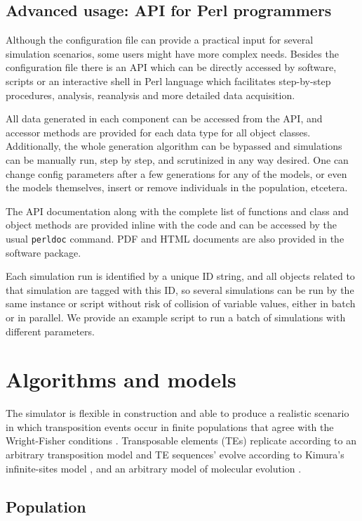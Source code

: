 \documentclass[10pt]{article}
\begin{document}
\subsection{Advanced usage: API for Perl programmers}

Although the configuration file can provide a practical input for
several simulation scenarios, some users might have more complex
needs. Besides the configuration file there is an API which can be
directly accessed by software, scripts or an interactive shell in
Perl language which facilitates step-by-step procedures, analysis,
reanalysis and more detailed data acquisition.

All data generated in each component can be accessed from the API, and
accessor methods are provided for each data type for all object
classes. Additionally, the whole generation algorithm can be bypassed
and simulations can be manually run, step by step, and scrutinized in
any way desired. One can change config parameters after a few
generations for any of the models, or even the models themselves,
insert or remove individuals in the population, etcetera.

The API documentation along with the complete list of functions and
class and object methods are provided inline with the code and can be
accessed by the usual \verb|perldoc| command. PDF and HTML documents
are also provided in the software package.

Each simulation run is identified by a unique ID string, and all
objects related to that simulation are tagged with this ID, so several
simulations can be run by the same instance or script without risk of
collision of variable values, either in batch or in parallel. We
provide an example script to run a batch of simulations with different
parameters.


\section{Algorithms and models}

The simulator is flexible in construction and able to produce a
realistic scenario in which transposition events occur in finite
populations that agree with the Wright-Fisher
conditions \cite{HC98}. Transposable elements (TEs) replicate according
to an arbitrary transposition model and TE sequences' evolve according
to Kimura's infinite-sites model \cite{Taj96}, and an arbitrary model
of molecular evolution \cite{Yan06}.

\subsection{Population}
\end{document}
